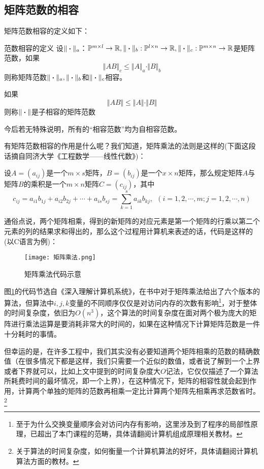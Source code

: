 \documentclass[12pt, a4paper, oneside, UTF8]{ctexbook}
\begin{document}
\subsection{矩阵范数的相容}

矩阵范数相容的定义如下：
\begin{defn}{范数相容的定义}{}
    设$\Vert\boldsymbol{\cdot}\Vert_a$：$\mathbb{P}^{m\times l}\to\mathbb{R}, \Vert\boldsymbol{\cdot}\Vert_b:\mathbb{P}^{l\times n}\to\mathbb{R}, \Vert\boldsymbol{\cdot}\Vert_c:\mathbb{P}^{m\times n}\to\mathbb{R}$是矩阵范数，如果\[\Vert AB\Vert_c\leq\Vert A\Vert_a\cdot\Vert B\Vert_b\]
    则称矩阵范数$\Vert\boldsymbol{\cdot}\Vert_a, \Vert\boldsymbol{\cdot}\Vert_b$和$\Vert\boldsymbol{\cdot}\Vert_c$相容。

    如果\[\Vert AB\Vert\leq\Vert A\Vert\cdot\Vert B\Vert\]则称$\Vert\boldsymbol{\cdot}\Vert$是子相容的矩阵范数
\end{defn}

\begin{rmk}
    今后若无特殊说明，所有的“相容范数”均为自相容范数。
\end{rmk}

有矩阵范数相容的作用是什么呢？我们知道，矩阵乘法的法则是这样的(下面这段话摘自同济大学《工程数学——线性代数》)：

设$A=(a_{ij})$是一个$m\times s$矩阵，$B=(b_{ij})$是一个$x\times n$矩阵，那么规定矩阵$A$与矩阵$B$的乘积是一个$m\times n$矩阵$C=(c_{ij})$，其中\[
c_{ij}=a_{i1}b_{1j}+a_{i2}b_{2j}+\cdots+a_{is}b_{sj}=\sum_{k=1}^{s}a_{ik}b_{kj},\ \ (i=1,2,\cdots,m;j=1,2,\cdots,n)
\]

通俗点说，两个矩阵相乘，得到的新矩阵的对应元素是第一个矩阵的行乘以第二个元素的列的结果求和得出的，那么这个过程用计算机来表述的话，代码是这样的(以C语言为例)：


\begin{figure}[h]
    \centering
    \texttt{[image: 矩阵乘法.png]}
    \caption{矩阵乘法代码示意}
    \label{fig:1.1}
\end{figure}
图\ref{fig:1.1}的代码节选自《深入理解计算机系统》，在书中对于矩阵乘法给出了六个版本的算法，但算法中$i,j,k$变量的不同顺序仅仅是对访问内存的次数有影响\footnote[1]{至于为什么交换变量顺序会对访问内存有影响，这里涉及到了程序的局部性原理，已超出了本门课程的范畴，具体请翻阅计算机组成原理相关教材。}，对于整体的时间复杂度，依旧为$O(n^3)$，这个算法的时间复杂度在面对两个极为庞大的矩阵进行乘法运算是要消耗非常大的时间的，如果在这种情况下计算矩阵范数是一件十分耗时的事情。

但幸运的是，在许多工程中，我们其实没有必要知道两个矩阵相乘的范数的精确数值（在很多情况下都是这样，我们只需要一个近似的数值，或者说了解到一个上界或者下界就可以，比如上文中提到的时间复杂度大$O$记法，它仅仅描述了一个算法所耗费时间的最坏情况，即一个上界），在这种情况下，矩阵的相容性就会起到作用，计算两个单独的矩阵的范数再相乘一定比计算两个矩阵先相乘再求范数省时。\footnote[2]{关于算法的时间复杂度，如何衡量一个计算机算法的好坏，具体请翻阅计算机算法方面的教材。}
\end{document}
